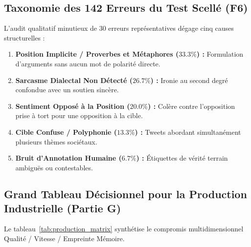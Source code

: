 \documentclass[11pt,a4paper]{article}
\begin{document}
\subsection{Taxonomie des 142 Erreurs du Test Scellé (F6)}
L'audit qualitatif minutieux de 30 erreurs représentatives dégage cinq causes structurelles :
\begin{enumerate}[noitemsep]
    \item \textbf{Position Implicite / Proverbes et Métaphores ($33.3\%$) :} Formulation d'arguments sans aucun mot de polarité directe.
    \item \textbf{Sarcasme Dialectal Non Détecté ($26.7\%$) :} Ironie au second degré confondue avec un soutien sincère.
    \item \textbf{Sentiment Opposé à la Position ($20.0\%$) :} Colère contre l'opposition prise à tort pour une opposition à la cible.
    \item \textbf{Cible Confuse / Polyphonie ($13.3\%$) :} Tweets abordant simultanément plusieurs thèmes sociétaux.
    \item \textbf{Bruit d'Annotation Humaine ($6.7\%$) :} Étiquettes de vérité terrain ambiguës ou contestables.
\end{enumerate}

\subsection{Grand Tableau Décisionnel pour la Production Industrielle (Partie G)}
Le tableau~\ref{tab:production_matrix} synthétise le compromis multidimensionnel Qualité / Vitesse / Empreinte Mémoire.
\end{document}
